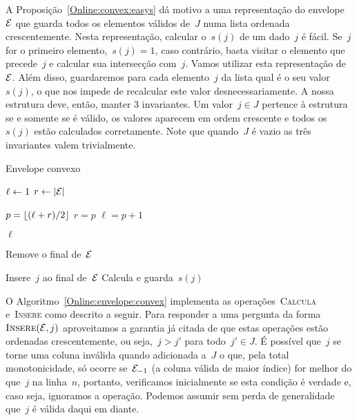 A Proposição~\ref{Online:convex:easys} dá motivo a uma representação do envelope~$\mathcal{E}$ que guarda todos os elementos válidos de~$J$ numa lista ordenada crescentemente. Nesta representação, calcular o~$s(j)$ de um dado~$j$ é fácil. Se~$j$ for o primeiro elemento,~$s(j) = 1$, caso contrário, basta visitar o elemento que precede~$j$ e calcular sua intersecção com~$j$. Vamos utilizar esta representação de~$\mathcal{E}$. Além disso, guardaremos para cada elemento~$j$ da lista qual é o seu valor~$s(j)$, o que nos impede de recalcular este valor desnecessariamente. A nossa estrutura deve, então, manter 3 invariantes. Um valor~$j \in J$ pertence à estrutura se e somente se é válido, os valores aparecem em ordem crescente e todos os~$s(j)$ estão calculados corretamente. Note que quando~$J$ é vazio as três invariantes valem trivialmente.

\begin{algorithm}[h]
\caption{Envelope convexo}
\label{Online:envelope:convex}
\begin{algorithmic}[1]
    \State $\ell \leftarrow 1$
    \State $r \leftarrow |\mathcal{E}|$
    
        \State $p = \lfloor (\ell+r)/2 \rfloor$
            \State $r = p$
        \Else
            \State $\ell = p+1$
        \EndIf
    \EndWhile

    \State \Return $\ell$
\EndFunction

        \State \Return
    \EndIf
    
        \State Remove o final de~$\mathcal{E}$
    \EndWhile

    \State Insere~$j$ ao final de~$\mathcal{E}$
    \State Calcula e guarda~$s(j)$
\EndFunction
\end{algorithmic}
\end{algorithm}

O Algoritmo~\ref{Online:envelope:convex} implementa as operações~\textsc{Calcula} e~\textsc{Insere} como descrito a seguir. Para responder a uma pergunta da forma~$\textsc{Insere}(\mathcal{E},j)$ aproveitamos a garantia já citada de que estas operações estão ordenadas crescentemente, ou seja,~$j > j'$ para todo~$j' \in J$. É possível que~$j$ se torne uma coluna inválida quando adicionada a~$J$ o que, pela total monotonicidade, só ocorre se~$\mathcal{E}_{-1}$ (a coluna válida de maior índice) for melhor do que~$j$ na linha~$n$, portanto, verificamos inicialmente se esta condição é verdade e, caso seja, ignoramos a operação. Podemos assumir sem perda de generalidade que~$j$ é válida daqui em diante.

